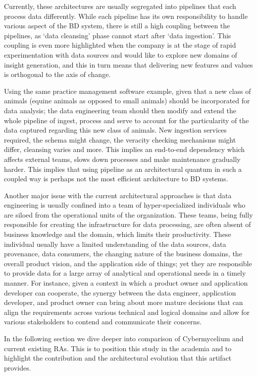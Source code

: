 \documentclass[review]{elsarticle}
\begin{document}
Currently, these architectures are usually segregated into pipelines that each process data differently. While each pipeline has its own responsibility to handle various aspect of the BD system, there is still a high coupling between the pipelines, as `data cleansing' phase cannot start after `data ingestion'. This coupling is even more highlighted when the company is at the stage of rapid experimentation with data sources and would like to explore new domains of insight generation, and this in turn means that delivering new features and values is orthogonal to the axis of change.

Using the same practice management software example, given that a new class of animals (equine animals as opposed to small animals) should be incorporated for data analysis; the data engineering team should then modify and extend the whole pipeline of ingest, process and serve to account for the particularity of the data captured regarding this new class of animals. New ingestion services required, the schema might change, the veracity checking mechanisms might differ, cleansing varies and more. This implies an end-to-end dependency which affects external teams, slows down processes and make maintenance gradually harder. This implies that using pipeline as an architectural quantum in such a coupled way is perhaps not the most efficient architecture to BD systems.

Another major issue with the current architectural approaches is that data engineering is usually confined into a team of hyper-specialized individuals who are siloed from the operational units of the organization. These teams, being fully responsible for creating the infrastructure for data processing, are often absent of business knowledge and the domain, which limits their productivity. These individual usually have a limited understanding of the data sources, data provenance, data consumers, the changing nature of the business domains, the overall product vision, and the application side of things; yet they are responsible to provide data for a large array of analytical and operational needs in a timely manner. For instance, given a context in which a product owner and application developer can cooperate, the synergy between the data engineer, application developer, and product owner can bring about more mature decisions that can align the requirements across various technical and logical domains and allow for various stakeholders to contend and communicate their concerns.

In the following section we dive deeper into comparison of Cybermycelium and current existing RAs. This is to position this study in the academia and to highlight the contribution and the architectural evolution that this artifact provides. 
\end{document}
